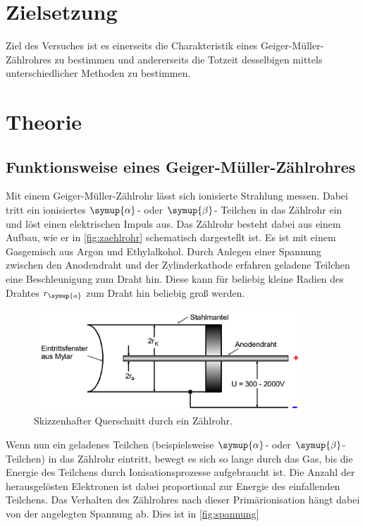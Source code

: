 \section{Zielsetzung}
Ziel des Versuches ist es einerseits die Charakteristik eines Geiger-Müller-Zählrohres zu bestimmen und andererseits die Totzeit desselbigen
mittels unterschiedlicher Methoden zu bestimmen. 
\section{Theorie}
\label{sec:Theorie}
\subsection{Funktionsweise eines Geiger-Müller-Zählrohres}
Mit einem Geiger-Müller-Zählrohr lässt sich ionisierte Strahlung messen. Dabei tritt ein ionisiertes $\symup{\alpha}$- oder $\symup{\beta}$-
Teilchen in das Zählrohr ein und löst einen elektrischen Impuls aus. Das Zählrohr besteht dabei aus einem Aufbau, wie er in \autoref{fig:zaehlrohr}
schematisch dargestellt ist. Es ist mit einem Gasgemisch aus Argon und Ethylalkohol. Durch Anlegen einer Spannung zwischen den Anodendraht und
der Zylinderkathode erfahren geladene Teilchen eine Beschleunigung zum Draht hin. Diese kann für beliebig kleine Radien des Drahtes
$r_{\symup{a}}$ zum Draht hin beliebig groß werden.
\begin{figure}
    \centering
    \includegraphics[width=0.9\textwidth]{content/aufbau.png}
    \caption{Skizzenhafter Querschnitt durch ein Zählrohr.}
    \label{fig:zaehlrohr}
\end{figure}
Wenn nun ein geladenes Teilchen (beispielsweise $\symup{\alpha}$- oder $\symup{\beta}$-Teilchen) in das Zählrohr eintritt, bewegt es sich so 
lange durch das Gas, bis die Energie des Teilchens durch Ionisationsprozesse aufgebraucht ist. Die Anzahl der herausgelösten Elektronen
ist dabei proportional zur Energie des einfallenden Teilchens.
Das Verhalten des Zählrohres nach dieser Primärionisation hängt dabei von der angelegten Spannung ab. Dies ist in \autoref{fig:spannung}
